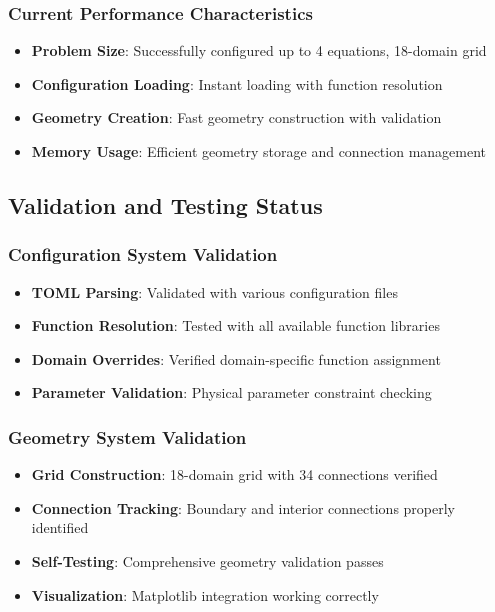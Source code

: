 \subsubsection{Current Performance Characteristics}
\begin{itemize}
    \item \textbf{Problem Size}: Successfully configured up to 4 equations, 18-domain grid
    \item \textbf{Configuration Loading}: Instant loading with function resolution
    \item \textbf{Geometry Creation}: Fast geometry construction with validation
    \item \textbf{Memory Usage}: Efficient geometry storage and connection management
\end{itemize}

\subsection{Validation and Testing Status}

\subsubsection{Configuration System Validation}
\begin{itemize}
    \item \textbf{TOML Parsing}: Validated with various configuration files
    \item \textbf{Function Resolution}: Tested with all available function libraries
    \item \textbf{Domain Overrides}: Verified domain-specific function assignment
    \item \textbf{Parameter Validation}: Physical parameter constraint checking
\end{itemize}

\subsubsection{Geometry System Validation}
\begin{itemize}
    \item \textbf{Grid Construction}: 18-domain grid with 34 connections verified
    \item \textbf{Connection Tracking}: Boundary and interior connections properly identified
    \item \textbf{Self-Testing}: Comprehensive geometry validation passes
    \item \textbf{Visualization}: Matplotlib integration working correctly
\end{itemize}

